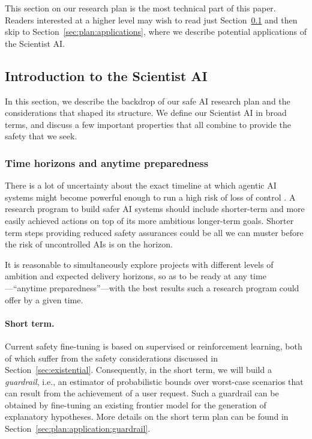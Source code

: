 This section on our research plan is the most technical part of this paper. Readers interested at a higher level may wish to read just Section~\ref{sec:plan:introduction} and then skip to Section~\ref{sec:plan:applications}, where we describe potential applications of the Scientist AI.


\subsection{Introduction to the Scientist AI}
\label{sec:plan:introduction}

In this section, we describe the backdrop of our safe AI research plan and the considerations that shaped its structure. We define our Scientist AI in broad terms, and discuss a few important properties that all combine to provide the safety that we seek.

    \subsubsection{Time horizons and anytime preparedness}
    
There is a lot of uncertainty about the exact timeline at which agentic AI systems might become powerful enough to run a high risk of loss of control \cite{epoch.ai.blog.literature.review.of.transformative.artificial.intelligence.timelines}. A research program to build safer AI systems should include shorter-term and more easily achieved actions on top of its more ambitious longer-term goals. Shorter term steps providing reduced safety assurances could be all we can muster before the risk of uncontrolled AIs is on the horizon.

It is reasonable to simultaneously explore projects with different levels of ambition and expected delivery horizons, so as to be ready at any time---``anytime preparedness''---with the best results such a research program could offer by a given time. 

\paragraph{Short term.} Current safety fine-tuning is based on supervised or reinforcement learning, both of which suffer from the safety considerations discussed in Section~\ref{sec:existential}. Consequently, in the short term, we will build a \textit{guardrail}, i.e., an estimator of probabilistic bounds over worst-case scenarios that can result from the achievement of a user request. Such a guardrail can be obtained by fine-tuning an existing frontier model for the generation of explanatory hypotheses. More details on the short term plan can be found in Section~\ref{sec:plan:application:guardrail}.


